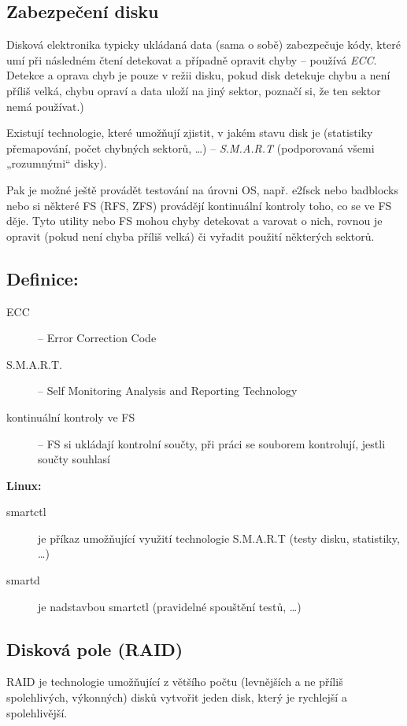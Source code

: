 \documentclass[a4paper, 11pt]{article}
\begin{document}
\subsection{Zabezpečení disku}
Disková elektronika typicky ukládaná data (sama o sobě) zabezpečuje kódy, které umí při následném čtení detekovat a případně opravit chyby -- používá \emph{ECC}. Detekce a oprava chyb je pouze v režii disku, pokud disk detekuje chybu a není příliš velká, chybu opraví a data uloží na jiný sektor, poznačí si, že ten sektor nemá používat.)
 
Existují technologie, které umožňují zjistit, v jakém stavu disk je (statistiky přemapování, počet chybných sektorů, \ldots) -- \emph{S.M.A.R.T} (podporovaná všemi „rozumnými“ disky).
 
Pak je možné ještě provádět testování na úrovni OS, např. e2fsck nebo badblocks nebo si některé FS (RFS, ZFS) provádějí kontinuální kontroly toho, co se ve FS děje. Tyto utility nebo FS mohou chyby detekovat a varovat o nich, rovnou je opravit (pokud není chyba příliš velká) či vyřadit použití některých sektorů.

\newpage
\subsection*{Definice:}
\begin{description}
\item[ECC] -- Error Correction Code
\item[S.M.A.R.T.] -- Self Monitoring Analysis and Reporting Technology
\item[kontinuální kontroly ve FS] -- FS si ukládají kontrolní součty, při práci se souborem kontrolují, jestli součty souhlasí
\end{description}

\textbf{Linux:}
\begin{description}
\item[smartctl] je příkaz umožňující využití technologie S.M.A.R.T (testy disku, statistiky, \ldots)
\item[smartd] je nadstavbou smartctl (pravidelné spouštění testů, \ldots)
\end{description}

\subsection{Disková pole (RAID)} \label{RAIDs}
RAID je technologie umožňující z většího počtu (levnějších a ne příliš spolehlivých, výkonných) disků vytvořit jeden disk, který je rychlejší a spolehlivější.
 
\end{document}
